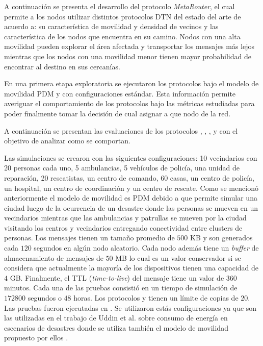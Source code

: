 A continuación se presenta el desarrollo del protocolo \textit{MetaRouter}, el
cual permite a los nodos utilizar distintos protocolos DTN del estado del arte
de acuerdo a: su característica de movilidad y densidad de vecinos y las
característica de los nodos que encuentra en su camino. Nodos con una alta
movilidad pueden explorar el área afectada y transportar los mensajes más lejos
mientras que los nodos con una movilidad menor tienen mayor probabilidad de
encontrar al destino en sus cercanías.

En una primera etapa exploratoria se ejecutaron los protocolos bajo el modelo de
movilidad PDM y con configuraciones estándar. Esta información permite averiguar
el comportamiento de los protocolos bajo las métricas estudiadas para poder
finalmente tomar la decisión de cual asignar a que nodo de la red.



A continuación se presentan las evaluaciones de los protocolos \epidemic, \syw,
\syf, \maxprop{} y \prophet{} \cite{lindgren_probabilistic_2003} con el objetivo
de analizar como se comportan.

Las simulaciones se crearon con las siguientes configuraciones: 10 vecindarios
con 20 personas cada uno, 5 ambulancias, 5 vehículos de policía, una unidad de
reparación, 20 rescatistas, un centro de comando, 60 casas, un centro de
policía, un hospital, un centro de coordinación y un centro de rescate. Como se
mencionó anteriormente el modelo de movilidad es PDM
\cite{uddin_post-disaster_2009} debido a que permite simular una ciudad luego de
la ocurrencia de un desastre donde las personas se mueven en un vecindarios
mientras que las ambulancias y patrullas se mueven por la ciudad visitando los
centros y vecindarios entregando conectividad entre clusters de personas. Los
mensajes tienen un tamaño promedio de $500$ KB y son generados cada $120$ segundos
en algún nodo aleatorio. Cada nodo además tiene un \textit{buffer} de
almacenamiento de mensajes de $50$ MB lo cual es un valor conservador si se
considera que actualmente la mayoría de los dispositivos tienen una capacidad de
$4$ GB. Finalmente, el TTL (\textit{time-to-live}) del mensaje tiene un valor
de $360$ minutos. Cada una de las pruebas consistió en un tiempo de simulación
de $172800$ segundos o $48$ horas. Los protocolos \syw{} y \syf{} tienen un
límite de copias de $20$. Las pruebas fueron ejecutadas en \theone{}
\cite{keranen_one_2009}. Se utilizaron estás configuraciones ya que son las
utilizadas en el trabajo de Uddin et al. sobre consumo de energía en escenarios
de desastres donde se utiliza también el modelo de movilidad propuesto por
ellos \cite{uddin_intercontact_2013-1}.

